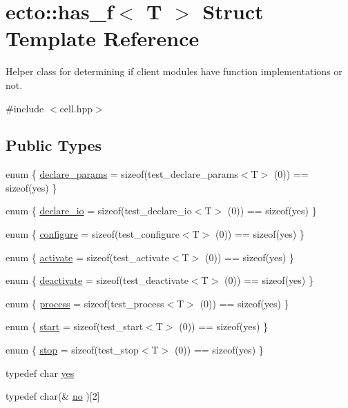 \hypertarget{structecto_1_1has__f}{\section{ecto\-:\-:has\-\_\-f$<$ \-T $>$ \-Struct \-Template \-Reference}
\label{structecto_1_1has__f}
}


\-Helper class for determining if client modules have function implementations or not.  




{\ttfamily \#include $<$cell.\-hpp$>$}

\subsection*{\-Public \-Types}
\begin{DoxyCompactItemize}
\item 
enum \{ \hyperlink{structecto_1_1has__f_a37dd9c69c6cfed2ac70c2529d493d410a41824f56b5af096de7e6ee2ccbe9943b}{declare\-\_\-params} =  sizeof(test\-\_\-declare\-\_\-params$<$\-T$>$ (0)) == sizeof(yes)
 \}
\item 
enum \{ \hyperlink{structecto_1_1has__f_abc0a1a04163d85af95636c6213729909ac01ab4ed00f005d55b0813ccb49166f2}{declare\-\_\-io} =  sizeof(test\-\_\-declare\-\_\-io$<$\-T$>$ (0)) == sizeof(yes)
 \}
\item 
enum \{ \hyperlink{structecto_1_1has__f_a173737354c871f8785a6bbe7640bda1da1bc6475abb988c1b998c700d66894960}{configure} =  sizeof(test\-\_\-configure$<$\-T$>$ (0)) == sizeof(yes)
 \}
\item 
enum \{ \hyperlink{structecto_1_1has__f_a8f077b20e8dd579e1a427ac6c80c3d3fa848797161f1dda4f3676f4e2271ebe40}{activate} =  sizeof(test\-\_\-activate$<$\-T$>$ (0)) == sizeof(yes)
 \}
\item 
enum \{ \hyperlink{structecto_1_1has__f_afa9dc8feb074d51ee4600f20447b2724a0f0eba1c7cf0a59268313a95842a7b42}{deactivate} =  sizeof(test\-\_\-deactivate$<$\-T$>$ (0)) == sizeof(yes)
 \}
\item 
enum \{ \hyperlink{structecto_1_1has__f_a575b2f80b107061801e4c2ebd36bd2fcaa6d57b41a7edff0b538fbfddd6e1bf0e}{process} =  sizeof(test\-\_\-process$<$\-T$>$ (0)) == sizeof(yes)
 \}
\item 
enum \{ \hyperlink{structecto_1_1has__f_a2f5a531214c34e93b8efd059afed9348a210df924551c3e6407abe7c1f12b85d0}{start} =  sizeof(test\-\_\-start$<$\-T$>$ (0)) == sizeof(yes)
 \}
\item 
enum \{ \hyperlink{structecto_1_1has__f_af1ab6e8ed499c6c3b404cd7aeda85c87a6db3f78bcdda21cf158666ed1f9dfead}{stop} =  sizeof(test\-\_\-stop$<$\-T$>$ (0)) == sizeof(yes)
 \}
\item 
typedef char \hyperlink{structecto_1_1has__f_a3fb902f1eed02919195aff1a6b28eb76}{yes}
\item 
typedef char(\& \hyperlink{structecto_1_1has__f_ae0c6da775cf20caed616e24681af2807}{no} )\mbox{[}2\mbox{]}
\end{DoxyCompactItemize}
